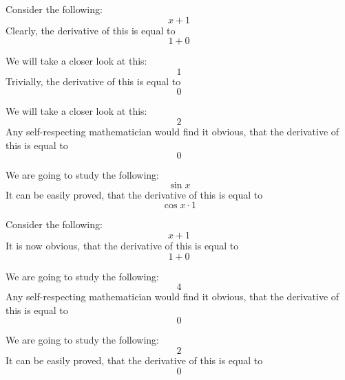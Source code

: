 \documentclass{article}
\begin{document}
Consider the following:
\begin{equation}
x + 1 
\end{equation}
Clearly, the derivative of this is equal to
\begin{equation}
1 + 0 
\end{equation}

We will take a closer look at this:
\begin{equation}
1 
\end{equation}
Trivially, the derivative of this is equal to
\begin{equation}
0 
\end{equation}

We will take a closer look at this:
\begin{equation}
2 
\end{equation}
Any self-respecting mathematician would find it obvious, that the derivative of this is equal to
\begin{equation}
0 
\end{equation}

We are going to study the following:
\begin{equation}
\sin x 
\end{equation}
It can be easily proved, that the derivative of this is equal to
\begin{equation}
\cos x \cdot 1 
\end{equation}

Consider the following:
\begin{equation}
x + 1 
\end{equation}
It is now obvious, that the derivative of this is equal to
\begin{equation}
1 + 0 
\end{equation}

We are going to study the following:
\begin{equation}
4 
\end{equation}
Any self-respecting mathematician would find it obvious, that the derivative of this is equal to
\begin{equation}
0 
\end{equation}

We are going to study the following:
\begin{equation}
2 
\end{equation}
It can be easily proved, that the derivative of this is equal to
\begin{equation}
0 
\end{equation}
\end{document}
